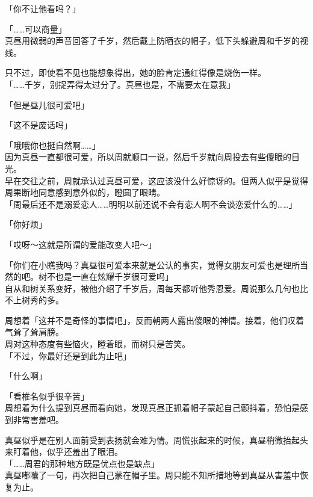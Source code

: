 「你不让他看吗？」

「……可以商量」\\

真昼用微弱的声音回答了千岁，然后戴上防晒衣的帽子，低下头躲避周和千岁的视线。

只不过，即使看不见也能想象得出，她的脸肯定通红得像是烧伤一样。\\

「……千岁，别捉弄得太过分了。真昼也是，不需要太在意我」

「但是昼儿很可爱吧」

「这不是废话吗」

「哦哦你也挺自然啊……」\\

因为真昼一直都很可爱，所以周就顺口一说，然后千岁就向周投去有些傻眼的目光。\\

早在交往之前，周就承认过真昼可爱，这应该没什么好惊讶的。但两人似乎是觉得周果断地同意感到意外似的，瞪圆了眼睛。\\

「周最后还不是溺爱恋人……明明以前还说不会有恋人啊不会谈恋爱什么的……」

「你好烦」

「哎呀～这就是所谓的爱能改变人吧～」

「你们在小瞧我吗？真昼很可爱本来就是公认的事实，觉得女朋友可爱也是理所当然的吧。树不也是一直在炫耀千岁很可爱吗」\\

自从和树关系变好，被他介绍了千岁后，周每天都听他秀恩爱。周说那么几句也比不上树秀的多。

周想着「这并不是奇怪的事情吧」，反而朝两人露出傻眼的神情。接着，他们叹着气耸了耸肩膀。\\

周对这种态度有些恼火，瞪着眼，而树只是苦笑。\\

「不过，你最好还是到此为止吧」

「什么啊」

「看椎名似乎很辛苦」\\

周想着为什么提到真昼而看向她，发现真昼正抓着帽子蒙起自己颤抖着，恐怕是感到非常害羞吧。

真昼似乎是在别人面前受到表扬就会难为情。周慌张起来的时候，真昼稍微抬起头来盯着他，似乎还羞出了眼泪。\\

「……周君的那种地方既是优点也是缺点」\\

真昼嘟囔了一句，再次把自己蒙在帽子里。周只能不知所措地等到真昼从害羞中恢复为止。
